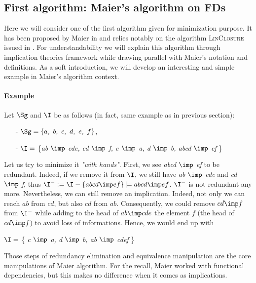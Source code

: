 \subsection{First algorithm: Maier's algorithm on FDs}

Here we will consider one of the first algorithm given for minimization 
purpose. It has been proposed by Maier in \cite{maier_theory_1983, 
david_minimum_1980} and relies notably on the algorithm \textsc{LinClosure} issued in \cite{beeri_computational_1979}. For understandability we will explain this algorithm through implication theories framework while drawing parallel with Maier's notation and definitions. As a soft introduction, we will develop an interesting and simple example in Maier's algorithm context.


\paragraph{Example} Let $\Sg$ and $\I$ be as follows (in fact, same example as 
in previous section):
\begin{itemize}
	\item[-] $\Sg = \{a, \ b, \ c, \ d, \ e, \ f \}$,
	\item[-] $\I =$ \{\textit{ab $\imp$ cde, cd $\imp$ f, c $\imp$ a, d $\imp$ b, abcd $\imp$ ef} \} 
\end{itemize}
\noindent Let us try to minimize it \textit{"with hands"}. First, we see \textit{abcd $\imp$ ef} to be redundant. Indeed, if we remove it from $\I$, we still have \textit{ab $\imp$ cde} and \textit{cd $\imp$ f}, thus $\I^{-} := \I - \{ abcd \imp ef \} \models abcd \imp ef$. $\I^{-}$ is not redundant any more. 
Nevertheless, we can still remove an implication. Indeed, not only we can reach 
$ab$ from $cd$, but also $cd$ from $ab$. Consequently, we could remove $cd \imp 
f$ from $\I^{-}$ while adding to the head of $ab \imp cde$ the element
$f$ (the head of $cd \imp f$) to avoid loss of informations. Hence, we 
would end up with 
\begin{center}
	$\I =$ \{ \textit{c $\imp$ a, d $\imp$ b, ab $\imp$ cdef} \}
\end{center}

\vspace{1.2em}

Those steps of redundancy elimination and equivalence manipulation are the core 
manipulations of Maier algorithm. For the recall, Maier worked with functional
dependencies, but this makes no difference when it comes as implications. 

